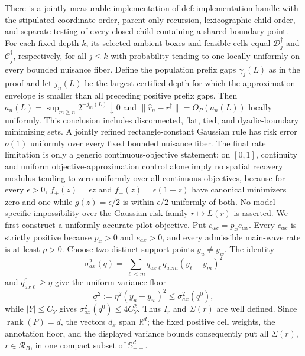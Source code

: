 There is a jointly measurable implementation of \(\mathrm{def:implementation\text{-}handle}\) with the stipulated coordinate order, parent-only recursion, lexicographic child order, and separate testing of every closed child containing a shared-boundary point. For each fixed depth \(k\), its selected ambient boxes and feasible cells equal \(\mathcal D_j^\dagger\) and \(\mathcal C_j^\dagger\), respectively, for all \(j\le k\) with probability tending to one locally uniformly on every bounded nuisance fiber. Define the population prefix gaps \(\gamma_j(L)\) as in the proof and let \(j_n(L)\) be the largest certified depth for which the approximation envelope is smaller than all preceding positive prefix gaps. Then \(a_n(L)=\sup_{m\ge n}2^{-j_m(L)}\downarrow0\) and \(\lVert\widehat r_n-r^\dagger\rVert=O_P(a_n(L))\) locally uniformly. This conclusion includes disconnected, flat, tied, and dyadic-boundary minimizing sets. A jointly refined rectangle-constant Gaussian rule has risk error \(o(1)\) uniformly over every fixed bounded nuisance fiber. The final rate limitation is only a generic continuous-objective statement: on \([0,1]\), continuity and uniform objective-approximation control alone imply no spatial recovery modulus tending to zero uniformly over all continuous objectives, because for every \(\epsilon>0\), \(f_+(z)=\epsilon z\) and \(f_-(z)=\epsilon(1-z)\) have canonical minimizers zero and one while \(g(z)=\epsilon/2\) is within \(\epsilon/2\) uniformly of both. No model-specific impossibility over the Gaussian-risk family \(r\mapsto L(r)\) is asserted.
We first construct a uniformly accurate pilot objective.  Put \(c_{ax}=p_xe_{ax}\).  Every \(c_{ax}\) is strictly positive because \(p_x>0\) and \(e_{ax}>0\), and every admissible main-wave rate is at least \(\rho>0\).  Choose two distinct support points \(y_u\ne y_w\).  The identity
\[
\sigma^2_{ax}(q)=\sum_{\ell<m}q_{ax\ell}q_{axm}(y_\ell-y_m)^2
\]
and \(q^0_{ax\ell}\ge\eta\) give the uniform variance floor
\[
\underline\sigma^2:=\eta^2(y_u-y_w)^2
\le \sigma^2_{ax}(q^0),
\]
while \(|Y|\le C_Y\) gives \(\sigma^2_{ax}(q^0)\le4C_Y^2\).  Thus \(I_r\) and \(\Sigma(r)\) are well defined.  Since \(\operatorname{rank}(F)=d\), the vectors \(d_x\) span \(\mathbb R^d\); the fixed positive cell weights, the annotation floor, and the displayed variance bounds consequently put all \(\Sigma(r)\), \(r\in\mathcal R_B\), in one compact subset of \(\mathbb S_{++}^d\).

